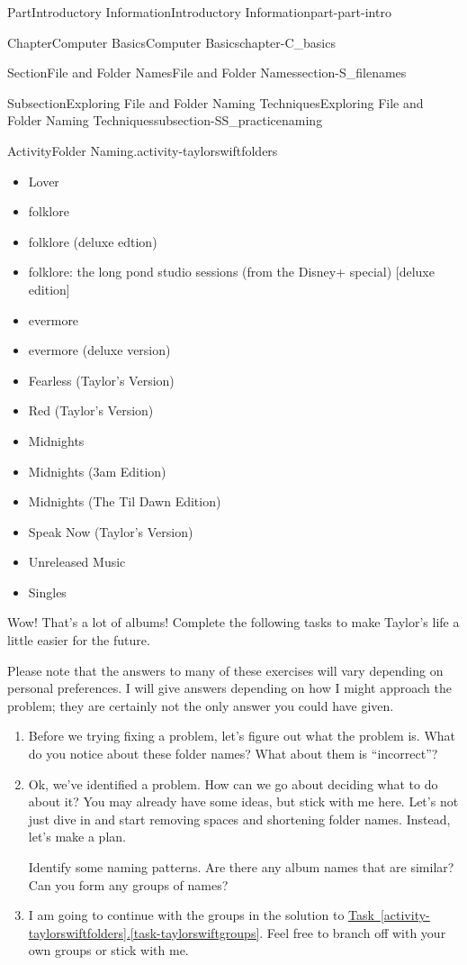\documentclass[oneside,10pt,]{book}
\newcommand{\xreffont}{\relax}
\begin{document}
\begin{partptx}{Part}{Introductory Information}{}{Introductory Information}{}{}{part-part-intro}
\begin{chapterptx}{Chapter}{Computer Basics}{}{Computer Basics}{}{}{chapter-C_basics}
\begin{sectionptx}{Section}{File and Folder Names}{}{File and Folder Names}{}{}{section-S_filenames}
\begin{subsectionptx}{Subsection}{Exploring File and Folder Naming Techniques}{}{Exploring File and Folder Naming Techniques}{}{}{subsection-SS_practicenaming}
\begin{activity}{Activity}{Folder Naming.}{activity-taylorswiftfolders}
\begin{multicols}{2}
\begin{itemize}[label=\textbullet]
\item{}Lover%
\item{}folklore%
\item{}folklore (deluxe edtion)%
\item{}folklore: the long pond studio sessions (from the Disney+ special) [deluxe edition]%
\item{}evermore%
\item{}evermore (deluxe version)%
\item{}Fearless (Taylor's Version)%
\item{}Red (Taylor's Version)%
\item{}Midnights%
\item{}Midnights (3am Edition)%
\item{}Midnights (The Til Dawn Edition)%
\item{}Speak Now (Taylor's Version)%
\item{}Unreleased Music%
\item{}Singles%
\end{itemize}
\end{multicols}
%
\par
Wow! That's a lot of albums! Complete the following tasks to make Taylor's life a little easier for the future.%
\par
Please note that the answers to many of these exercises will vary depending on personal preferences. I will give answers depending on how I might approach the problem; they are certainly not the only answer you could have given.%
\begin{enumerate}[font=\bfseries,label=(\alph*),ref=\alph*]%
\item{}Before we trying fixing a problem, let's figure out what the problem is. What do you notice about these folder names? What about them is ``incorrect''?%
\item\label{task-taylorswiftgroups}Ok, we've identified a problem. How can we go about deciding what to do about it? You may already have some ideas, but stick with me here. Let's not just dive in and start removing spaces and shortening folder names. Instead, let's make a plan.%
\par
Identify some naming patterns. Are there any album names that are similar? Can you form any groups of names?%
\item{}I am going to continue with the groups in the solution to \hyperref[task-taylorswiftgroups]{Task~{\xreffont\ref{activity-taylorswiftfolders}}.{\xreffont\ref{task-taylorswiftgroups}}}. Feel free to branch off with your own groups or stick with me.%

\end{enumerate}
\end{activity}
\end{subsectionptx}
\end{sectionptx}
\end{chapterptx}
\end{partptx}
\end{document}
